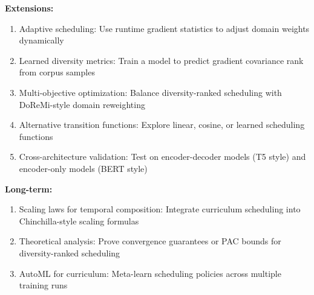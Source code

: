 \textbf{Extensions:}
\begin{enumerate}
\item Adaptive scheduling: Use runtime gradient statistics to adjust domain weights dynamically
\item Learned diversity metrics: Train a model to predict gradient covariance rank from corpus samples
\item Multi-objective optimization: Balance diversity-ranked scheduling with DoReMi-style domain reweighting
\item Alternative transition functions: Explore linear, cosine, or learned scheduling functions
\item Cross-architecture validation: Test on encoder-decoder models (T5 style) and encoder-only models (BERT style)
\end{enumerate}

\textbf{Long-term:}
\begin{enumerate}
\item Scaling laws for temporal composition: Integrate curriculum scheduling into Chinchilla-style scaling formulas
\item Theoretical analysis: Prove convergence guarantees or PAC bounds for diversity-ranked scheduling
\item AutoML for curriculum: Meta-learn scheduling policies across multiple training runs
\end{enumerate}
